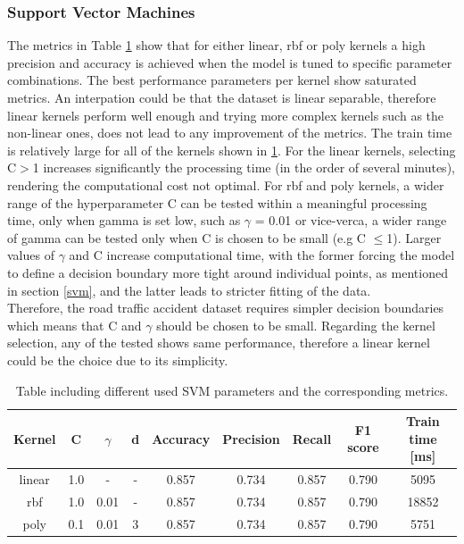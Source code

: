 \documentclass{article}
\begin{document}
\subsubsection*{Support Vector Machines}
The metrics in Table \ref{table:rta_SVM} show that for either linear, rbf or poly kernels a high precision and accuracy is achieved when the model is tuned to specific parameter combinations. The best performance parameters per kernel show saturated metrics. An interpation could be that the dataset is linear separable, therefore linear kernels perform well enough and trying more complex kernels such as the non-linear ones, does not lead to any improvement of the metrics. The train time is relatively large for all of the kernels shown in \ref{table:rta_SVM}. For the linear kernels, selecting C$>$1 increases significantly the processing time (in the order of several minutes), rendering the computational cost not optimal. For rbf and poly kernels, a wider range of the hyperparameter C can be tested within a meaningful processing time, only when gamma is set low, such as $\gamma$ = 0.01 or vice-verca, a wider range of gamma can be tested only when C is chosen to be small (e.g C $\le$1). Larger values of $\gamma$ and C increase computational time, with the former forcing the model to define a decision boundary more tight around individual points, as mentioned in section \ref{svm}, and the latter leads to stricter fitting of the data. 
\\ 
Therefore, the road traffic accident dataset requires simpler decision boundaries which means that C and $\gamma$ should be chosen to be small. Regarding the kernel selection, any of the tested shows same performance, therefore a linear kernel could be the choice due to its simplicity.  
\begin{table}[h!]
\centering
\begin{tabular}{||c c c c c c c c c||} 
 \hline
 Kernel & C & $\gamma$ &d & Accuracy & Precision & Recall & F1 score & Train time [ms] \\ [0.5ex] 
 \hline\hline
 linear &  1.0 & - & - & 0.857 & 0.734 & 0.857 & 0.790 & 5095 \\
  rbf &  1.0 & 0.01 & - & 0.857 & 0.734 & 0.857 & 0.790 & 18852\\
 poly &  0.1 & 0.01 & 3 & 0.857 & 0.734 & 0.857 & 0.790 & 5751 \\[1ex] 
 \hline
\end{tabular}
\caption{Table including different used SVM parameters and the corresponding metrics.}
\label{table:rta_SVM}
\end{table}
\end{document}
